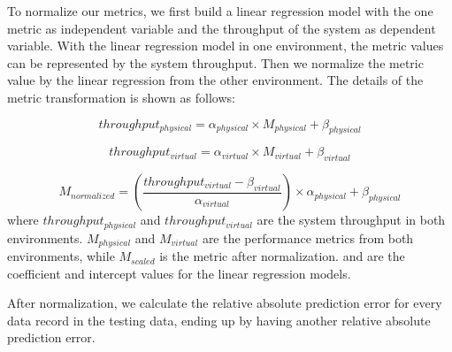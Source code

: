 

To normalize our metrics, we first build a linear regression model with the one metric as independent variable and the throughput of the system as dependent variable. With the linear regression model in one environment, the metric values can be represented by the system throughput. Then we normalize the metric value by the linear regression from the other environment. The details of the metric transformation is shown as follows:

\begin{equation*}
throughput_{physical}= \alpha_{physical} \times M_{physical} + \beta_{physical}
\end{equation*}

\begin{equation*}
throughput_{virtual}= \alpha_{virtual} \times M_{virtual} + \beta_{virtual}
\end{equation*}

\begin{equation}
M_{normalized} = (\frac{throughput_{virtual}-\beta_{virtual}}{\alpha_{virtual}})\times\alpha_{physical}+\beta_{physical}
\end{equation}
where $throughput_{physical}$ and $throughput_{virtual}$ are the system throughput in both environments. $ M_{physical}$ and $M_{virtual}$ are the performance metrics from both environments, while $M_{scaled}$ is the metric after normalization. \alpha and \beta are the coefficient and intercept values for the linear regression models.

After normalization, we calculate the relative absolute prediction error for every data record in the testing data, ending up by having another relative absolute prediction error.






